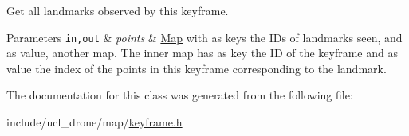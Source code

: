 Get all landmarks observed by this keyframe. 


\begin{DoxyParams}[1]{Parameters}
\mbox{\tt in,out}  & {\em points} & \hyperlink{classMap}{Map} with as keys the I\+Ds of landmarks seen, and as value, another map. The inner map has as key the ID of the keyframe and as value the index of the points in this keyframe corresponding to the landmark. \\
\hline
\end{DoxyParams}


The documentation for this class was generated from the following file\+:\begin{DoxyCompactItemize}
\item 
include/ucl\+\_\+drone/map/\hyperlink{keyframe_8h}{keyframe.\+h}\end{DoxyCompactItemize}
